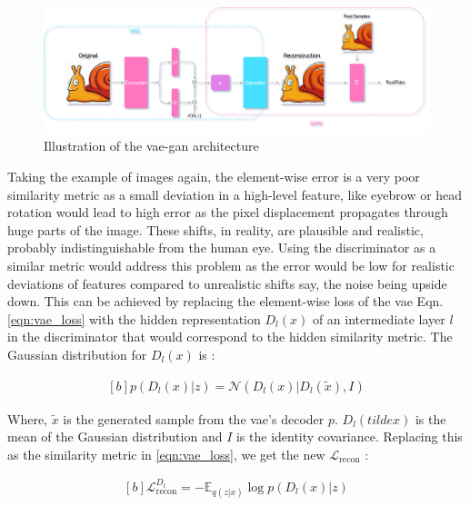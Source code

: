 \begin{figure}[h]
    \centering
    \includegraphics[scale=0.15]{figures/arch/vae_gan_arch.png}
    \caption{Illustration of the \ac{vae}-\ac{gan} architecture}
    \label{fig:vae_gan_arch}
\end{figure}

Taking the example of images again, the element-wise error is a very poor similarity metric as a small deviation in a high-level feature, like eyebrow or head rotation would lead to high error as the pixel displacement propagates through huge parts of the image. These shifts, in reality, are plausible and realistic, probably indistinguishable from the human eye. Using the discriminator as a similar metric would address this problem as the error would be low for realistic deviations of features compared to unrealistic shifts say, the noise being upside down. This can be achieved by replacing the element-wise loss of the \ac{vae} Eqn. \ref{eqn:vae_loss} with the hidden representation $D_{l}(x)$ of an intermediate layer $l$ in the discriminator that would correspond to the hidden similarity metric. The Gaussian distribution for $D_{l}(x)$ is :
    
\begin{equation} \label{eqn:gan_similarity}
    \begin{aligned}[b]
        p\left(D_{l}(x) | z\right)=\mathcal{N}\left(D_{l}(x) | D_{l}(\tilde{x}), I\right)
    \end{aligned}
\end{equation}

Where, $\tilde{x}$ is the generated sample from the \ac{vae}'s decoder $p$. $D_{l}(tilde{x})$ is the mean of the Gaussian distribution and $I$ is the identity covariance. Replacing this as the similarity metric in \ref{eqn:vae_loss}, we get the new $\mathcal{L}_{\text {recon}}$ :

\begin{equation} \label{eqn:vaegan_recon}
    \begin{gathered}[b]
        \mathcal{L}_{\text {recon}}^{D_{l}}=-\mathbb{E}_{q(z | x)} \log p\left(D_{l}(x) | z\right)
    \end{gathered}
\end{equation}

